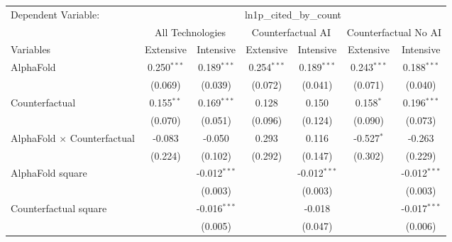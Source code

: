 \begingroup
\centering
\begin{tabular}{lcccccc}
   \tabularnewline \midrule \midrule
   Dependent Variable: & \multicolumn{6}{c}{ln1p\_cited\_by\_count}\\
 & \multicolumn{2}{c}{All Technologies} & \multicolumn{2}{c}{Counterfactual AI} & \multicolumn{2}{c}{Counterfactual No AI} \\
\cmidrule(lr){1-1}\cmidrule(lr){2-3} \cmidrule(lr){4-5} \cmidrule(lr){6-7}
Variables & \multicolumn{1}{c}{Extensive} & \multicolumn{1}{c}{Intensive} & \multicolumn{1}{c}{Extensive} & \multicolumn{1}{c}{Intensive} & \multicolumn{1}{c}{Extensive} & \multicolumn{1}{c}{Intensive} \\
\cmidrule(lr){1-1}\cmidrule(lr){2-2} \cmidrule(lr){3-3} \cmidrule(lr){4-4} \cmidrule(lr){5-5} \cmidrule(lr){6-6} \cmidrule(lr){7-7}
   AlphaFold                          & 0.250$^{***}$ & 0.189$^{***}$  & 0.254$^{***}$ & 0.189$^{***}$  & 0.243$^{***}$ & 0.188$^{***}$\\   
                                      & (0.069)       & (0.039)        & (0.072)       & (0.041)        & (0.071)       & (0.040)\\   
   Counterfactual                     & 0.155$^{**}$  & 0.169$^{***}$  & 0.128         & 0.150          & 0.158$^{*}$   & 0.196$^{***}$\\   
                                      & (0.070)       & (0.051)        & (0.096)       & (0.124)        & (0.090)       & (0.073)\\   
   AlphaFold $\times$ Counterfactual  & -0.083        & -0.050         & 0.293         & 0.116          & -0.527$^{*}$  & -0.263\\   
                                      & (0.224)       & (0.102)        & (0.292)       & (0.147)        & (0.302)       & (0.229)\\   
   AlphaFold square                   &               & -0.012$^{***}$ &               & -0.012$^{***}$ &               & -0.012$^{***}$\\   
                                      &               & (0.003)        &               & (0.003)        &               & (0.003)\\   
   Counterfactual square              &               & -0.016$^{***}$ &               & -0.018         &               & -0.017$^{***}$\\   
                                      &               & (0.005)        &               & (0.047)        &               & (0.006)\\   

\end{tabular}
